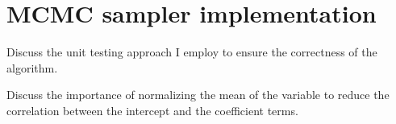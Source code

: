 \chapter{MCMC sampler implementation}

Discuss the unit testing approach I employ to ensure the correctness of the
algorithm.

Discuss the importance of normalizing the mean of the variable to reduce the
correlation between the intercept and the coefficient terms.